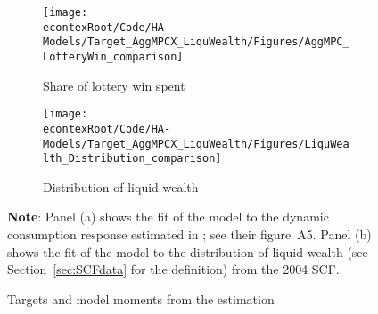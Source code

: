 \documentclass[\econtexRoot/HAFiscal]{subfiles}
\begin{document}
\begin{figure}[htb]
  \centering
  \begin{subfigure}[b]{.48\linewidth}
    \centering
    \texttt{[image: \\econtexRoot/Code/HA-Models/Target\_AggMPCX\_LiquWealth/Figures/AggMPC\_LotteryWin\_comparison]}
    \caption{Share of lottery win spent}
    \notinsubfile{\label{fig:aggmpclotterywin}}
  \end{subfigure}
  \begin{subfigure}[b]{.48\linewidth}
    \centering
    \texttt{[image: \\econtexRoot/Code/HA-Models/Target\_AggMPCX\_LiquWealth/Figures/LiquWealth\_Distribution\_comparison]}
    \caption{Distribution of liquid wealth}
    \notinsubfile{\label{fig:liquwealthdistribution}}
  \end{subfigure}%
  \caption{Targets and model moments from the estimation}
  \notinsubfile{\label{fig:splurge_estimation}}
  \parbox{16cm}{\small \vspace{.15cm} \textbf{Note}: Panel (a) shows the fit of the model to the dynamic consumption response estimated in \citet{fagereng_mpc_2021}; see their figure~A5.
Panel (b) shows the fit of the model to the distribution of liquid wealth (see Section~\ref{sec:SCFdata} for the definition) from the 2004 SCF.\normalsize}
\end{figure}


\end{document}
